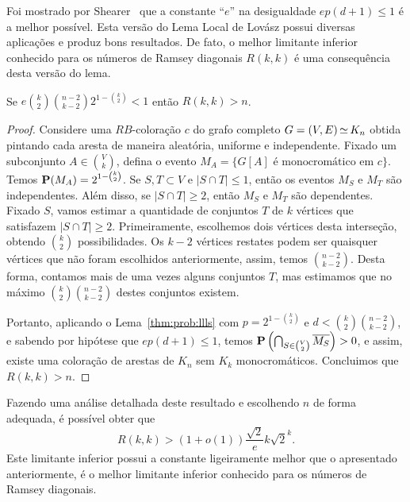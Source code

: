 Foi mostrado por Shearer~\cite{shearer1985problem} que a constante ``$e$'' na desigualdade $ep(d+1) \leq 1$ é a melhor possível. Esta versão do Lema Local de Lovász possui diversas aplicações e produz bons resultados. De fato, o melhor limitante inferior conhecido para os números de Ramsey diagonais $R(k,k)$ é uma consequência desta versão do lema.

\begin{theorem}
\label{thm:prob:ramseylll}
Se $\displaystyle e \binom{k}{2}\binom{n-2}{k-2} 2^{1 - \binom{k}{2}} < 1$ então $R(k,k) > n$.
\end{theorem}
\begin{proof}
Considere uma $RB$-coloração $c$ do grafo completo $G = (V,E) \operatorname{\simeq} K_n$ obtida pintando cada aresta de maneira aleatória, uniforme e independente. Fixado um subconjunto $A \in \binom{V}{k}$, defina o evento $M_A = \{G[A] \text{ é monocromático em } c\}$. Temos $\operatorname{\mathbf{P}}(M_A) = 2^{1- \binom{k}{2}}$. Se $S, T \subset V$ e $|S \cap T| \leq 1$, então os eventos $M_S$ e $M_T$ são independentes.
Além disso, se $|S \cap T| \geq 2$, então $M_S$ e $M_T$ são dependentes. Fixado $S$, vamos estimar a quantidade de conjuntos $T$ de $k$ vértices que satisfazem $|S \cap T| \geq 2$. Primeiramente, escolhemos dois vértices desta interseção, obtendo $\binom{k}{2}$ possibilidades. Os $k-2$ vértices restates podem ser quaisquer vértices que não foram escolhidos anteriormente, assim, temos $\binom{n-2}{k-2}$. Desta forma, contamos mais de uma vezes alguns conjuntos $T$, mas estimamos que no máximo $\binom{k}{2}\binom{n-2}{k-2}$ destes conjuntos existem.

Portanto, aplicando o Lema~\ref{thm:prob:llls} com $p = 2^{1 - \binom{k}{2}}$ e $d < \binom{k}{2}\binom{n-2}{k-2}$, e sabendo por hipótese que $ep(d+1) \leq 1$,
temos $\operatorname{\mathbf{P}} \left( \bigcap_{S \in \binom{V}{2}} \overline{M_S} \right) > 0$, e assim, existe uma coloração de arestas de $K_n$ sem $K_k$ monocromáticos. Concluimos que $R(k,k) > n$.
\end{proof}

Fazendo uma análise detalhada deste resultado e escolhendo $n$ de forma adequada, é possível obter que
\[R(k,k) > (1+o(1))\frac{\sqrt{2}}{e}k\sqrt{2}^k.\]
Este limitante inferior possui a constante ligeiramente melhor que o apresentado anteriormente, é o melhor limitante inferior conhecido para os números de Ramsey diagonais.

